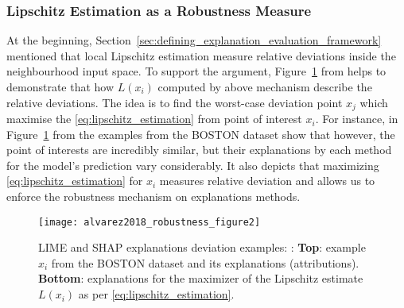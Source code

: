 \documentclass[english]{tktltiki2}
\theoremstyle{definition}
\theoremstyle{remark}
\begin{document}
\subsubsection{Lipschitz Estimation as a Robustness Measure}\label{sec:lipschitz_estimation_as_a_robustness_measure} %
At the beginning, Section~\ref{sec:defining_explanation_evaluation_framework} mentioned that local Lipschitz estimation measure relative deviations inside the neighbourhood input space. To support the argument, Figure~\ref{fig:alvarez2018_robustness_figure2} from \citep{alvarez2018robustness} helps to demonstrate that how $L(x_i)$ computed by above mechanism describe the relative deviations. The idea is to find the worst-case deviation point $x_j$ which maximise the \eqref{eq:lipschitz_estimation} from point of interest $x_i$. For instance, in Figure~\ref{fig:alvarez2018_robustness_figure2} from \citep{alvarez2018robustness} the examples from the BOSTON dataset show that however, the point of interests are incredibly similar, but their explanations by each method for the model’s prediction vary considerably. It also depicts that maximizing \eqref{eq:lipschitz_estimation} for $x_i$ measures relative deviation and allows us to enforce the robustness mechanism on explanations methods.
\begin{figure}[H]
	\texttt{[image: alvarez2018\_robustness\_figure2]}
	\vspace*{-10mm}
	\caption{LIME and SHAP explanations deviation examples: \citep{alvarez2018robustness}: \textbf{Top}: example $x_i$ from the BOSTON dataset and its explanations (attributions). \textbf{Bottom}: explanations for the maximizer of the Lipschitz estimate $L(x_i)$ as per \eqref{eq:lipschitz_estimation}.}
	\label{fig:alvarez2018_robustness_figure2}
\end{figure}


\end{document}
